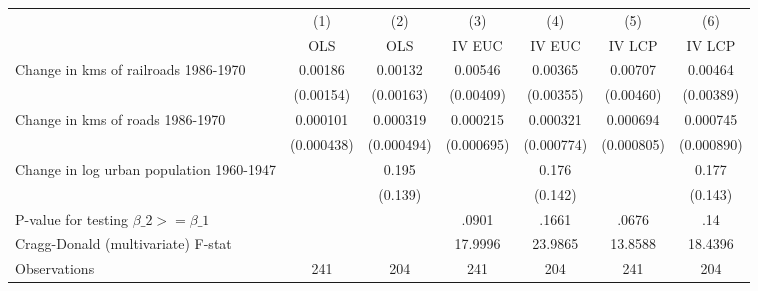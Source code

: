 {
\def\sym#1{\ifmmode^{#1}\else\(^{#1}\)\fi}
\begin{tabular}{l*{6}{c}}
\hline\hline
                &\multicolumn{1}{c}{(1)}&\multicolumn{1}{c}{(2)}&\multicolumn{1}{c}{(3)}&\multicolumn{1}{c}{(4)}&\multicolumn{1}{c}{(5)}&\multicolumn{1}{c}{(6)}\\
                &\multicolumn{1}{c}{OLS}&\multicolumn{1}{c}{OLS}&\multicolumn{1}{c}{IV EUC}&\multicolumn{1}{c}{IV EUC}&\multicolumn{1}{c}{IV LCP}&\multicolumn{1}{c}{IV LCP}\\
\hline
Change in kms of railroads 1986-1970&  0.00186         &  0.00132         &  0.00546         &  0.00365         &  0.00707         &  0.00464         \\
                &(0.00154)         &(0.00163)         &(0.00409)         &(0.00355)         &(0.00460)         &(0.00389)         \\
[1em]
Change in kms of roads 1986-1970& 0.000101         & 0.000319         & 0.000215         & 0.000321         & 0.000694         & 0.000745         \\
                &(0.000438)         &(0.000494)         &(0.000695)         &(0.000774)         &(0.000805)         &(0.000890)         \\
[1em]
Change in log urban population 1960-1947&                  &    0.195         &                  &    0.176         &                  &    0.177         \\
                &                  &  (0.139)         &                  &  (0.142)         &                  &  (0.143)         \\
\hline
P-value for testing $\beta\_{2} >= \beta\_{1}$&                  &                  &    .0901         &    .1661         &    .0676         &      .14         \\
Cragg-Donald (multivariate) F-stat&                  &                  &  17.9996         &  23.9865         &  13.8588         &  18.4396         \\
Observations    &      241         &      204         &      241         &      204         &      241         &      204         \\
\hline\hline
\end{tabular}
}
